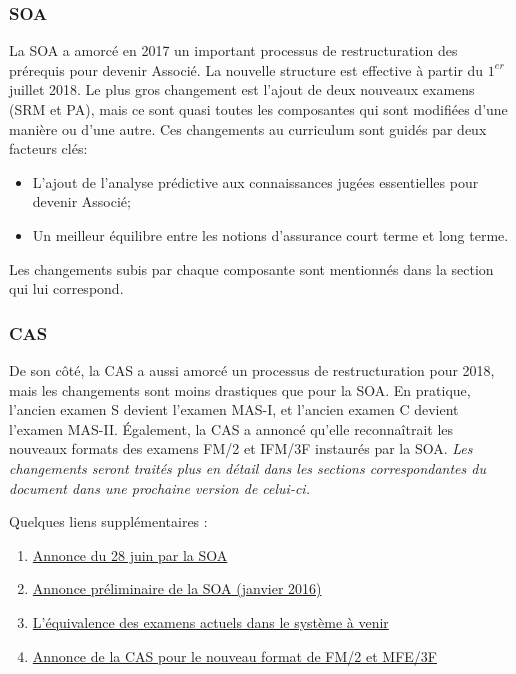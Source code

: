 \subsubsection*{SOA}
La SOA a amorcé en 2017 un important processus de restructuration des prérequis pour devenir Associé. La nouvelle structure est effective à partir du $1^{er}$ juillet 2018. Le plus gros changement est l’ajout de deux nouveaux examens (SRM et PA), mais ce sont quasi toutes les composantes qui sont modifiées d'une manière ou d'une autre. Ces changements au curriculum sont guidés par deux facteurs clés:

\begin{itemize}
\item L'ajout de l'analyse prédictive aux connaissances jugées essentielles pour devenir Associé;
\item Un meilleur équilibre entre les notions d'assurance court terme et long terme.
\end{itemize}
 Les changements subis par chaque composante sont mentionnés dans la section qui lui correspond.

\subsubsection*{CAS}
De son côté, la CAS a aussi amorcé un processus de restructuration pour 2018, mais les changements sont moins drastiques que pour la SOA. En pratique, l'ancien examen S devient l'examen MAS-I, et l'ancien examen C devient l'examen MAS-II. Également, la CAS a annoncé qu’elle reconnaîtrait les nouveaux formats des examens FM/2 et IFM/3F instaurés par la SOA. \textit{Les changements seront traités plus en détail dans les sections correspondantes du document dans une prochaine version de celui-ci.}

\vspace{\baselineskip} 

Quelques liens supplémentaires :
\begin{enumerate}
\item \href{https://www.soa.org/Education/General-Info/2016-asa-cera-curriculum-changes.aspx}{Annonce du 28 juin par la SOA}
\item \href{https://soa.qualtrics.com/CP/File.php?F=F_0TDd9bj143TrCW9}{Annonce préliminaire de la SOA (janvier 2016)}
\item \href{https://www.soa.org/Education/General-Info/2016-transition-rules-asa-candidated.aspx}{L’équivalence des examens actuels dans le système à venir}
\item \href{http://www.casact.org/press/index.cfm?fa=viewArticle&articleID=3273}{Annonce de la CAS pour le nouveau format de FM/2 et MFE/3F}
\end{enumerate}
\vspace{\baselineskip} 

